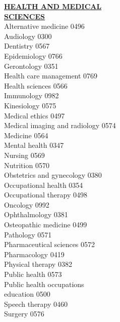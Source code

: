\documentclass[9pt,twoside]{article}
\newcommand{\categoryheading}[1]{{\fontsize{8}{11}\selectfont \textbf{\uline{#1}}}}
\begin{document}
\begin{multicols}{3}
\categoryheading{HEALTH AND MEDICAL \leavevmode \\
SCIENCES} \leavevmode \\
Alternative medicine \hfill 0496 \leavevmode \\
Audiology \hfill 0300 \leavevmode \\
Dentistry \hfill 0567 \leavevmode \\
Epidemiology \hfill 0766 \leavevmode \\
Gerontology \hfill 0351 \leavevmode \\
Health care management \hfill 0769 \leavevmode \\
Health sciences \hfill 0566 \leavevmode \\
Immunology \hfill 0982 \leavevmode \\
Kinesiology \hfill 0575 \leavevmode \\
Medical ethics \hfill 0497 \leavevmode \\
Medical imaging and radiology \hfill 0574 \leavevmode \\
Medicine \hfill 0564 \leavevmode \\
Mental health \hfill 0347 \leavevmode \\
Nursing \hfill 0569 \leavevmode \\
Nutrition \hfill 0570 \leavevmode \\
Obstetrics and gynecology \hfill 0380 \leavevmode \\
Occupational health \hfill 0354 \leavevmode \\
Occupational therapy \hfill 0498 \leavevmode \\
Oncology \hfill 0992 \leavevmode \\
Ophthalmology \hfill 0381 \leavevmode \\
Osteopathic medicine \hfill 0499 \leavevmode \\
Pathology \hfill 0571 \leavevmode \\
Pharmaceutical sciences \hfill 0572 \leavevmode \\
Pharmacology \hfill 0419 \leavevmode \\
Physical therapy \hfill 0382 \leavevmode \\
Public health \hfill 0573 \leavevmode \\
Public health occupations \\
education \hfill 0500 \leavevmode \\
Speech therapy \hfill 0460 \leavevmode \\
Surgery \hfill 0576 \leavevmode \\

\end{multicols}
\end{document}
